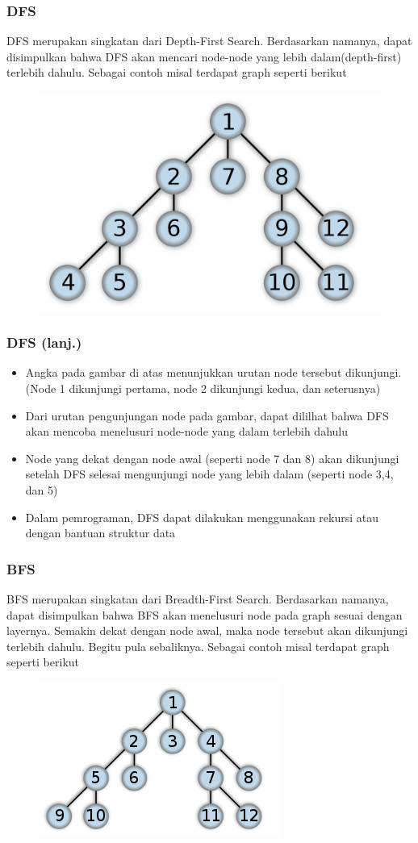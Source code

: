 \begin{frame}
\frametitle{DFS}

\alert{DFS} merupakan singkatan dari Depth-First Search. Berdasarkan namanya, dapat disimpulkan bahwa DFS akan mencari node-node yang lebih dalam(depth-first) terlebih dahulu. Sebagai contoh misal terdapat graph seperti berikut

\begin{figure}
  \centering
  \includegraphics[width=6 cm]{asset/dfs.png}
\end{figure}
\end{frame}

\begin{frame}
\frametitle{DFS (lanj.)}
\begin{itemize}
  \item Angka pada gambar di atas menunjukkan urutan node tersebut dikunjungi. (Node 1 dikunjungi pertama, node 2 dikunjungi kedua, dan seterusnya)
  \item Dari urutan pengunjungan node pada gambar, dapat dililhat bahwa DFS akan mencoba menelusuri node-node yang dalam terlebih dahulu
  \item Node yang dekat dengan node awal (seperti node 7 dan 8) akan dikunjungi setelah DFS selesai mengunjungi node yang lebih dalam (seperti node 3,4, dan 5)
  \item Dalam pemrograman, DFS dapat dilakukan menggunakan rekursi atau dengan bantuan struktur data 
\end{itemize}
\end{frame}

\begin{frame}
\frametitle{BFS}

\alert{BFS} merupakan singkatan dari Breadth-First Search. Berdasarkan namanya, dapat disimpulkan bahwa BFS akan menelusuri node pada graph sesuai dengan layernya. Semakin dekat dengan node awal, maka node tersebut akan dikunjungi terlebih dahulu. Begitu pula sebaliknya. Sebagai contoh misal terdapat graph seperti berikut

\begin{figure}
  \centering
  \includegraphics[width=6 cm]{asset/bfs.png}
\end{figure}

\end{frame}

